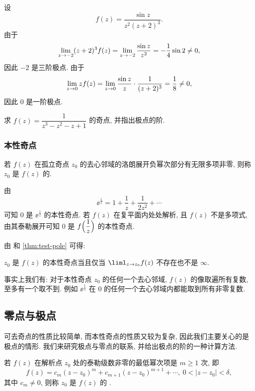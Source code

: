 \begin{example}
  设
  \[
    f(z)=\frac{\sin z}{z^2(z+2)^3}.
  \]
  由于
  \[
     \lim_{z\rightarrow -2}(z+2)^3f(z)
    =\lim_{z\rightarrow -2}\frac{\sin z}{z^2}
    =-\frac14\sin 2\neq0,
  \]
  因此 $-2$ 是三阶极点.
  由于
  \[
     \lim_{z\rightarrow 0}zf(z)
    =\lim_{z\rightarrow 0}\frac{\sin z}z\cdot\frac1{(z+2)^3}
    =\frac18\neq0,
  \]
  因此 $0$ 是一阶极点.
\end{example}

\begin{exercise}
  求 $f(z)=\dfrac1{z^3-z^2-z+1}$ 的奇点, 并指出极点的阶.
\end{exercise}


\subsubsection{本性奇点}

\begin{definition}
  若 $f(z)$ 在孤立奇点 $z_0$ 的去心邻域的洛朗展开负幂次部分有无限多项非零, 则称 $z_0$ 是 $f(z)$ 的.
\end{definition}

\begin{example}
  由
  \[
    \ee^{\frac1z}=1+\frac1z+\frac1{2z^2}+\cdots
  \]
  可知 $0$ 是 $\ee^{\frac1z}$ 的本性奇点.
  若 $f(z)$ 在复平面内处处解析, 且 $f(z)$ 不是多项式, 由其泰勒展开可知 $0$ 是 $f\Bigl(\dfrac1z\Bigr)$ 的本性奇点.
\end{example}

由 和 \ref{thm:test-pole} 可得:
\begin{theorem}
  $z_0$ 是 $f(z)$ 的本性奇点当且仅当 $\liml_{z\ra z_0}f(z)$ 不存在也不是 $\infty$.
\end{theorem}

事实上我们有: 对于本性奇点 $z_0$ 的任何一个去心邻域, $f(z)$ 的像取遍所有复数, 至多有一个取不到.
例如 $\ee^{\frac1z}$ 在 $0$ 的任何一个去心邻域内都能取到所有非零复数.


\subsection{零点与极点}

可去奇点的性质比较简单, 而本性奇点的性质又较为复杂, 因此我们主要关心的是极点的情形.
我们来研究极点与零点的联系, 并给出极点的阶的一种计算方法.

\begin{definition}
  \label{def:zero-order}
  若 $f(z)$ 在解析点 $z_0$ 处的泰勒级数非零的最低幂次项是 $m\ge1$ 次, 即
  \[
    f(z)=c_m(z-z_0)^m+c_{m+1}(z-z_0)^{m+1}+\cdots,\ 0<|z-z_0|<\delta,
  \]
  其中 $c_m\neq 0$, 则称 $z_0$ 是 $f(z)$ 的 .\footnotemark
\end{definition}

